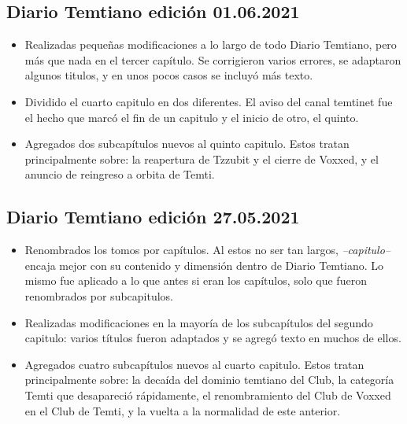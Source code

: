 \documentclass[
]{book}
\begin{document}
\hypertarget{diario-temtiano-ediciuxf3n-01.06.2021}{%
\subsection*{Diario Temtiano edición 01.06.2021}\label{diario-temtiano-ediciuxf3n-01.06.2021}}

\begin{itemize}
\item
  Realizadas pequeñas modificaciones a lo largo de todo Diario Temtiano, pero más que nada en el tercer capítulo. Se corrigieron varios errores, se adaptaron algunos titulos, y en unos pocos casos se incluyó más texto.
\item
  Dividido el cuarto capitulo en dos diferentes. El aviso del canal temtinet fue el hecho que marcó el fin de un capitulo y el inicio de otro, el quinto.
\item
  Agregados dos subcapítulos nuevos al quinto capitulo. Estos tratan principalmente sobre: la reapertura de Tzzubit y el cierre de Voxxed, y el anuncio de reingreso a orbita de Temti.
\end{itemize}

\hypertarget{diario-temtiano-ediciuxf3n-27.05.2021}{%
\subsection*{Diario Temtiano edición 27.05.2021}\label{diario-temtiano-ediciuxf3n-27.05.2021}}

\begin{itemize}
\item
  Renombrados los tomos por capítulos. Al estos no ser tan largos, \emph{--capitulo--} encaja mejor con su contenido y dimensión dentro de Diario Temtiano. Lo mismo fue aplicado a lo que antes si eran los capítulos, solo que fueron renombrados por subcapitulos.
\item
  Realizadas modificaciones en la mayoría de los subcapítulos del segundo capitulo: varios títulos fueron adaptados y se agregó texto en muchos de ellos.
\item
  Agregados cuatro subcapítulos nuevos al cuarto capitulo. Estos tratan principalmente sobre: la decaída del dominio temtiano del Club, la categoría Temti que desapareció rápidamente, el renombramiento del Club de Voxxed en el Club de Temti, y la vuelta a la normalidad de este anterior.
\end{itemize}
\end{document}
